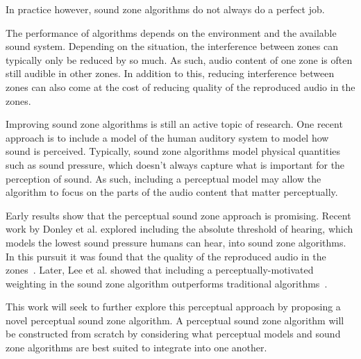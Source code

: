 In practice however, sound zone algorithms do not always do a perfect job.

The performance of algorithms depends on the environment and the available sound system.
Depending on the situation, the interference between zones can typically only be reduced by so much.
As such, audio content of one zone is often still audible in other zones.
In addition to this, reducing interference between zones can also come at the cost of reducing quality of the 
reproduced audio in the zones.

Improving sound zone algorithms is still an active topic of research.
One recent approach is to include a model of the human auditory system to model how sound is perceived.
Typically, sound zone algorithms model physical quantities such as sound pressure, which doesn't always capture
what is important for the perception of sound.
As such, including a perceptual model may allow the algorithm to focus on the parts of the audio content
that matter perceptually.

Early results show that the perceptual sound zone approach is promising.
Recent work by Donley et al. explored including the absolute threshold of hearing, which models the lowest sound pressure
humans can hear, into sound zone algorithms.
In this pursuit it was found that the quality of the reproduced audio in the zones~\cite{donley2015multizone}.
Later, Lee et al. showed that including a perceptually-motivated weighting in the sound zone algorithm outperforms 
traditional algorithms~\cite{lee2019towards,lee2020signal}.

This work will seek to further explore this perceptual approach by proposing a novel perceptual sound zone algorithm.
A perceptual sound zone algorithm will be constructed from scratch by considering what perceptual models and sound
zone algorithms are best suited to integrate into one another.

